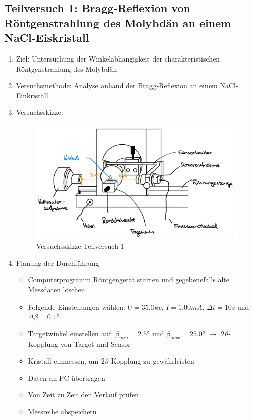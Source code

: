 \documentclass{article}
\begin{document}
\subsection{Teilversuch 1: Bragg-Reflexion von Röntgenstrahlung des Molybdän an einem NaCl-Eiskristall}
\begin{enumerate}[label = (\Roman*)]
    \item Ziel: Untersuchung der Winkelabhängigkeit der charakteristischen Röntgenstrahlung des Molybdän
    
    \item Versuchsmethode: Analyse anhand der Bragg-Reflexion an einem NaCl-Einkristall
    
    \item Versuchsskizze:
    
        \begin{figure}[H]
        \centering
        \includegraphics[width=0.7\linewidth]{Abbildungen/Aufbau Bragg Versuche.jpeg}
        \caption{Versuchsskizze Teilversuch 1}
        \end{figure}

    \item Planung der Durchführung
        \begin{itemize}
            \item Computerprogramm Röntgengerät starten und gegebenefalls alte Messdaten löschen
            \item Folgende Einstellungen wählen: $U=35.0kv$, $I=1.00mA$, $\Delta t=10s$ und $\Delta\beta=0.1°$
            \item Targetwinkel einstellen auf: $\beta_{min}=2.5°$ und $\beta_{max}=25.0°$ $\to$ $2\vartheta$-Kopplung von Target und Sensor
            \item Kristall einmessen, um $2\vartheta$-Kopplung zu gewährleisten
            \item Daten an PC übertragen
            \item Von Zeit zu Zeit den Verlauf prüfen
            \item Messreihe abspeichern
        \end{itemize}


\end{enumerate}
\end{document}
